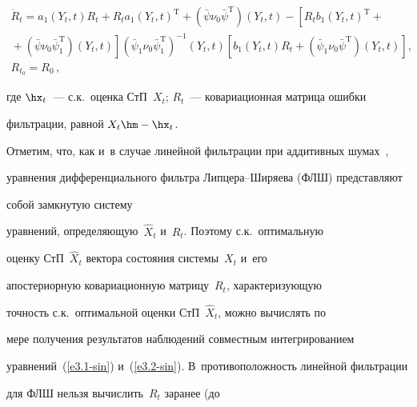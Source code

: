     \begin{multline}


\dot R_t =  a_1\left(Y_t,t\right) R_t + R_t a_1 \left(Y_t,t\right)^{\mathrm{T}} +


        \left(\bar \psi\nu_0\bar \psi^{\mathrm{T}}\right) \left(Y_t,t\right) -


    \left[ R_t b_1 \left(Y_t,t\right)^{\mathrm{T}}+{}\right.\\


\left.{}+\left(\bar \psi\nu_0\bar \psi_1^{\mathrm{T}}\right) \left(Y_t,t\right)\right] 


\left(\bar \psi_1\nu_0\bar \psi_1^{\mathrm{T}}\right)^{-1} 


\left(Y_t,t\right) \left[ b_1 \left(Y_t,t\right) R_t+ 


\left(\bar \psi_1 \nu_0 \bar \psi^{\mathrm{T}}\right)


    \left(Y_t,t\right)\right],\\


     R_{t_0} = R_0\,,


    \label{e3.2-sin}


    \end{multline}


где $\hx_t$~--- с.к.\ оценка СтП~$X_t$; $R_t$~--- ковариационная матрица ошибки 


фильтрации, равной $X_t\hm- \hx_t$.





Отметим, что, как и~в случае линейной фильтрации при аддитивных шумах~\cite{2-sin}, 


уравнения дифференциального фильтра Лип\-це\-ра--Ши\-ря\-ева (ФЛШ)  представляют 


собой замкнутую систему


уравнений, определяющую~$\hat X_t$ и~$R_t$. Поэтому с.к.\  оптимальную


оценку СтП~$\hat X_t$ вектора состояния системы~$X_t$ и~его


апостериорную ковариационную матрицу~$R_t$, характеризующую


точность с.к.\ оптимальной оценки СтП~$\hat X_t$, можно вычислять по


мере получения результатов наблюдений совместным интегрированием


уравнений~(\ref{e3.1-sin}) и~(\ref{e3.2-sin}). В~противоположность линейной фильтрации


для ФЛШ нельзя вычислить~$R_t$ заранее (до


